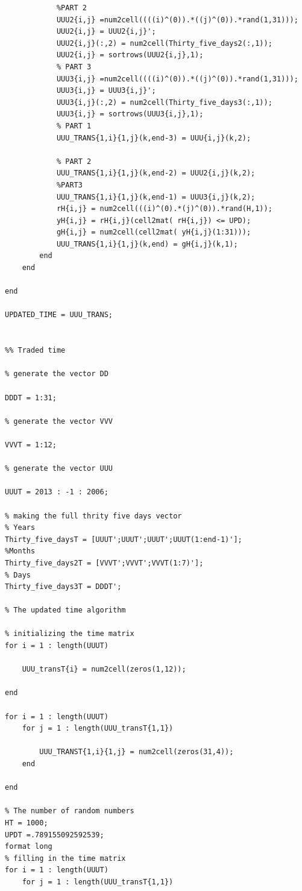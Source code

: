 \documentclass{DissertateUSU}
\begin{document}
\begin{verbatim}
            %PART 2
            UUU2{i,j} =num2cell((((i)^(0)).*((j)^(0)).*rand(1,31)));
            UUU2{i,j} = UUU2{i,j}';
            UUU2{i,j}(:,2) = num2cell(Thirty_five_days2(:,1));
            UUU2{i,j} = sortrows(UUU2{i,j},1);
            % PART 3
            UUU3{i,j} =num2cell((((i)^(0)).*((j)^(0)).*rand(1,31)));
            UUU3{i,j} = UUU3{i,j}';
            UUU3{i,j}(:,2) = num2cell(Thirty_five_days3(:,1));
            UUU3{i,j} = sortrows(UUU3{i,j},1);
            % PART 1
            UUU_TRANS{1,i}{1,j}(k,end-3) = UUU{i,j}(k,2);
            
            % PART 2
            UUU_TRANS{1,i}{1,j}(k,end-2) = UUU2{i,j}(k,2);
            %PART3
            UUU_TRANS{1,i}{1,j}(k,end-1) = UUU3{i,j}(k,2);
            rH{i,j} = num2cell(((i)^(0).*(j)^(0)).*rand(H,1));
            yH{i,j} = rH{i,j}(cell2mat( rH{i,j}) <= UPD);
            gH{i,j} = num2cell(cell2mat( yH{i,j}(1:31)));
            UUU_TRANS{1,i}{1,j}(k,end) = gH{i,j}(k,1);
        end
    end
    
end

UPDATED_TIME = UUU_TRANS;


%% Traded time

% generate the vector DD

DDDT = 1:31;

% generate the vector VVV

VVVT = 1:12;

% generate the vector UUU

UUUT = 2013 : -1 : 2006;

% making the full thrity five days vector
% Years
Thirty_five_daysT = [UUUT';UUUT';UUUT';UUUT(1:end-1)'];
%Months
Thirty_five_days2T = [VVVT';VVVT';VVVT(1:7)'];
% Days
Thirty_five_days3T = DDDT';

% The updated time algorithm

% initializing the time matrix
for i = 1 : length(UUUT)
    
    UUU_transT{i} = num2cell(zeros(1,12));
    
end

for i = 1 : length(UUUT)
    for j = 1 : length(UUU_transT{1,1})
        
        UUU_TRANST{1,i}{1,j} = num2cell(zeros(31,4));
    end
    
end

% The number of random numbers
HT = 1000;
UPDT =.789155092592539;
format long
% filling in the time matrix
for i = 1 : length(UUUT)
    for j = 1 : length(UUU_transT{1,1})
        

\end{verbatim}
\end{document}
